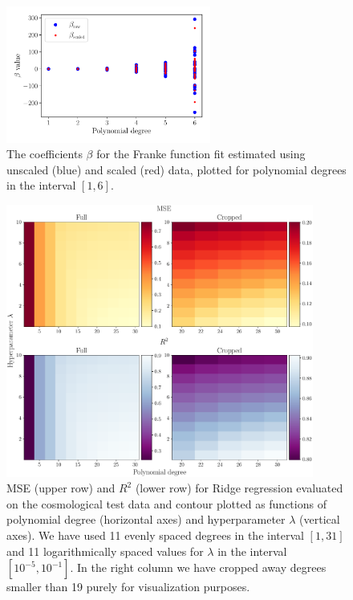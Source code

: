 \documentclass[aps,pra,english,notitlepage,reprint,nofootinbib]{revtex4-1}  %
\begin{document}
\begin{figure}
  \vspace*{-5pt}
  \centering %
  \includegraphics[width=0.6\textwidth]{../figs/a_beta_scaled_vs_raw.pdf}
  \caption{The coefficients $\beta$ for the Franke function fit estimated using unscaled (blue) and scaled (red) data, plotted for polynomial degrees in the interval $[1,6]$.}\label{appfig:a beta scaled vs raw}
  \vspace*{-5pt}
\end{figure}


\begin{figure}
  \vspace*{-5pt}
  \centering %
  \includegraphics[width=0.9\textwidth]{../figs/g_MSE_R2_Ridge.pdf}
  \caption{MSE (upper row) and $R^2$ (lower row) for Ridge regression evaluated on the cosmological test data and contour plotted as functions of polynomial degree (horizontal axes) and hyperparameter $\lambda$ (vertical axes). We have used 11 evenly spaced degrees in the interval $[1, 31]$ and 11 logarithmically spaced values for $\lambda$ in the interval $[10^{-5},10^{-1}]$. In the right column we have cropped away degrees smaller than 19 purely for visualization purposes.}\label{appfig:g MSE R2 Ridge}
  \vspace*{-5pt}
\end{figure}
\end{document}
